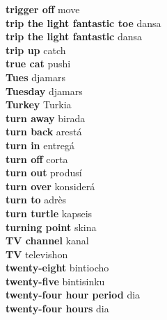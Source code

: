 \textbf{ trigger off  } move \\
\textbf{ trip the light fantastic toe  } dansa \\
\textbf{ trip the light fantastic  } dansa \\
\textbf{ trip up  } catch \\
\textbf{ true cat  } pushi \\
\textbf{ Tues  } djamars \\
\textbf{ Tuesday  } djamars \\
\textbf{ Turkey  } Turkia \\
\textbf{ turn away  } birada \\
\textbf{ turn back  } arestá \\
\textbf{ turn in  } entregá \\
\textbf{ turn off  } corta \\
\textbf{ turn out  } produsí \\
\textbf{ turn over  } konsiderá \\
\textbf{ turn to  } adrès \\
\textbf{ turn turtle  } kapseis \\
\textbf{ turning point  } skina \\
\textbf{ TV channel  } kanal \\
\textbf{ TV  } televishon \\
\textbf{ twenty-eight  } bintiocho \\
\textbf{ twenty-five  } bintisinku \\
\textbf{ twenty-four hour period  } dia \\
\textbf{ twenty-four hours  } dia \\
